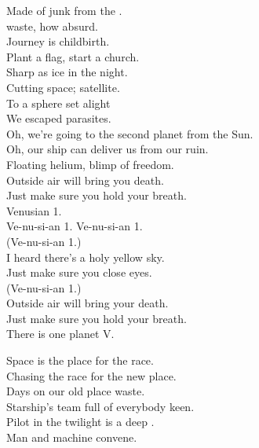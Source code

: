 Made of junk from the . \\
 waste, how absurd. \\
Journey is childbirth. \\
Plant a flag, start a church. \\
Sharp as ice in the night. \\
Cutting space; satellite. \\
To a sphere set alight \\
We escaped parasites. \\

Oh, we're going to the second planet from the Sun. \\
Oh, our ship can deliver us from our ruin. \\

Floating helium, blimp of freedom. \\
Outside air will bring you death. \\
Just make sure you hold your breath. \\
Venusian 1. \\

Ve-nu-si-an 1. Ve-nu-si-an 1. \\

(Ve-nu-si-an 1.) \\
I heard there's a holy yellow sky. \\
Just make sure you close eyes. \\

(Ve-nu-si-an 1.) \\
Outside air will bring your death. \\
Just make sure you hold your breath. \\

There is one planet V. \\





Space is the place for the  race. \\
Chasing the race for the new place. \\
Days on our old place waste. \\
Starship's team full of everybody keen. \\
Pilot in the twilight is a deep . \\
Man and machine convene. \\

